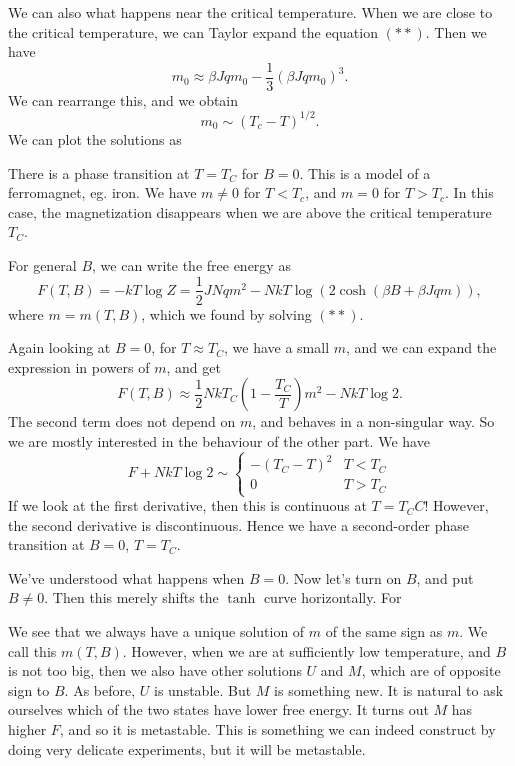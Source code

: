 \documentclass[a4paper]{article}
\begin{document}
We can also what happens near the critical temperature. When we are close to the critical temperature, we can Taylor expand the equation $(**)$. Then we have
\[
  m_0 \approx \beta J q m_0 - \frac{1}{3} (\beta J q m_0)^3.
\]
We can rearrange this, and we obtain
\[
  m_0 \sim (T_c - T)^{1/2}.
\]
We can plot the solutions as
\begin{center}
\end{center}
There is a phase transition at $T = T_C$ for $B = 0$. This is a model of a ferromagnet, eg. iron. We have $m \not= 0$ for $T < T_c$, and $m = 0$ for $T > T_c$. In this case, the magnetization disappears when we are above the critical temperature $T_C$.

For general $B$, we can write the free energy as
\[
  F(T, B) = -kT \log Z = \frac{1}{2} JNqm^2 - NkT \log\left(2 \cosh (\beta B + \beta J q m)\right),
\]
where $m = m(T, B)$, which we found by solving $(**)$.

Again looking at $B = 0$, for $T \approx T_C$, we have a small $m$, and we can expand the expression in powers of $m$, and get
\[
  F(T, B) \approx \frac{1}{2} NkT_C \left(1 - \frac{T_C}{T}\right) m^2 - NkT \log 2.
\]
The second term does not depend on $m$, and behaves in a non-singular way. So we are mostly interested in the behaviour of the other part. We have
\[
  F + NkT \log 2 \sim
  \begin{cases}
    -(T_C - T)^2 & T < T_C\\
    0 & T > T_C
  \end{cases}
\]
If we look at the first derivative, then this is continuous at $T = T_CC$! However, the second derivative is discontinuous. Hence we have a second-order phase transition at $B = 0$, $T = T_C$.

We've understood what happens when $B = 0$. Now let's turn on $B$, and put $B \not= 0$. Then this merely shifts the $\tanh$ curve horizontally. For


We see that we always have a unique solution of $m$ of the same sign as $m$. We call this $m(T, B)$. However, when we are at sufficiently low temperature, and $B$ is not too big, then we also have other solutions $U$ and $M$, which are of opposite sign to $B$. As before, $U$ is unstable. But $M$ is something new. It is natural to ask ourselves which of the two states have lower free energy. It turns out $M$ has higher $F$, and so it is metastable. This is something we can indeed construct by doing very delicate experiments, but it will be metastable.
\end{document}
